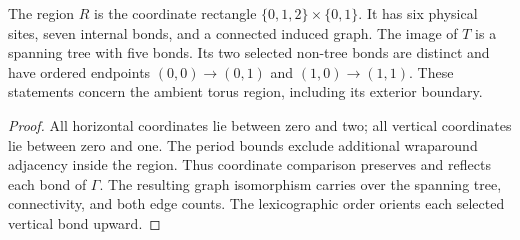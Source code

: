 \begin{lemma}
    \label{thm:peps_two_plaquette_torus_geometry}
    \leanok
    The region $R$ is the coordinate rectangle
    $\{0,1,2\}\times\{0,1\}$. It has six physical sites,
    seven internal bonds, and a connected induced graph.
    The image of $T$ is a spanning tree with five bonds.
    Its two selected non-tree bonds are distinct and have ordered endpoints
    $(0,0)\to(0,1)$ and $(1,0)\to(1,1)$.
    These statements concern the ambient torus region, including its exterior
    boundary.
\end{lemma}
\begin{proof}\leanok
    All horizontal coordinates lie between zero and two; all vertical
    coordinates lie between zero and one. The period bounds exclude
    additional wraparound adjacency inside the region. Thus coordinate
    comparison preserves and reflects each bond of $\Gamma$.
    The resulting graph isomorphism carries over the spanning tree,
    connectivity, and both edge counts. The lexicographic order
    orients each selected vertical bond upward.
\end{proof}
